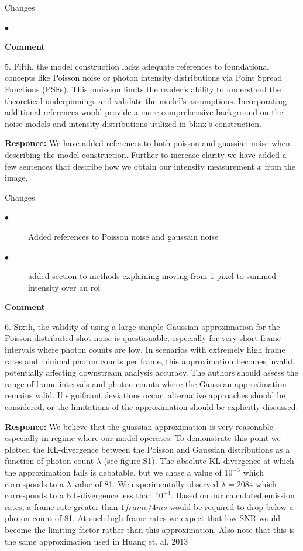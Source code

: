 \documentclass{article}
\begin{document}
 Changes
 \begin{description}
    \item[$\bullet$] 
\end{description}


\textbf{Comment}

5.	Fifth, the model construction lacks adequate references to foundational concepts 
like Poisson noise or photon intensity distributions via Point Spread Functions (PSFs). 
This omission limits the reader's ability to understand the theoretical underpinnings 
and validate the model's assumptions. Incorporating additional references would provide a 
more comprehensive background on the noise models and intensity distributions utilized in blinx's construction.

\underline{\textbf{Responce:}} 
We have added references to both poisson and guassian noise when describing the model construction. Further to 
increase clarity we have added a few sentences that describe how we obtain our intensity measurement $x$ from 
the image. 

Changes
\begin{description}
    \item[$\bullet$] Added references to Poisson noise and gaussain noise
    \item[$\bullet$] added section to methods explaining moving from 1 pixel to summed intensity over an roi 
\end{description}

\textbf{Comment}

6.	Sixth, the validity of using a large-sample Gaussian approximation for the 
Poisson-distributed shot noise is questionable, especially for very short frame 
intervals where photon counts are low. In scenarios with extremely high frame 
rates and minimal photon counts per frame, this approximation becomes invalid, 
potentially affecting downstream analysis accuracy. The authors should assess the 
range of frame intervals and photon counts where the Gaussian approximation remains valid. 
If significant deviations occur, alternative approaches should be considered, or the 
limitations of the approximation should be explicitly discussed. 

\underline{\textbf{Responce:}}
We believe that the guassian approximation is very reasonable especially in regime where our model operates. 
To demonstrate this point we plotted the KL-divergence between the Poisson and Gaussian distributions 
as a function of photon count $\lambda$ (see figure S1). The absolute KL-divergence at which the approximation fails 
is debatable, but we chose a value of $10^{-3}$ which corresponds to a $\lambda$ value of 81. We experimentally 
observed $\lambda=2084$ which corresponds to a KL-divergence less than $10^{-4}$.
%
Based on our calculated emission rates, a frame rate greater than $1 frame / 4 ms$ would be required to drop below 
a photon count of 81. At such high frame rates we expect that low SNR would become the limiting factor rather 
than this approximation. Also note that this is the same approximation used in Huang et. al. 2013
\end{document}

